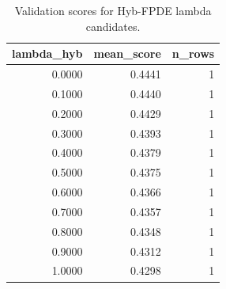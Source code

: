 \begin{table}[t]
\caption{Validation scores for Hyb-FPDE lambda candidates.}
\label{tab:lambda_distribution_computed}
\centering
\begin{tabular}{rrr}
\toprule
lambda\_hyb & mean\_score & n\_rows \\
\midrule
0.0000 & 0.4441 & 1 \\
0.1000 & 0.4440 & 1 \\
0.2000 & 0.4429 & 1 \\
0.3000 & 0.4393 & 1 \\
0.4000 & 0.4379 & 1 \\
0.5000 & 0.4375 & 1 \\
0.6000 & 0.4366 & 1 \\
0.7000 & 0.4357 & 1 \\
0.8000 & 0.4348 & 1 \\
0.9000 & 0.4312 & 1 \\
1.0000 & 0.4298 & 1 \\
\bottomrule
\end{tabular}

\end{table}
